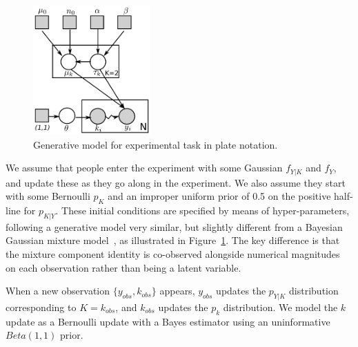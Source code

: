 \documentclass[10pt,letterpaper]{article}
\begin{document}




\begin{figure}
    \centering
    \includegraphics[width=0.4\textwidth]{results/model.pdf}
    \caption{Generative model for experimental task in plate notation.}
    \label{fig:model}
\end{figure}

We assume that people enter the experiment with some Gaussian $f_{Y|K}$ and $f_Y$, and update these as they go along in the experiment. We also assume they start with some Bernoulli $p_K$ and an improper uniform prior of 0.5 on the positive half-line for $p_{K|Y}$. These initial conditions are specified by means of hyper-parameters, following a generative model very similar, but slightly different from a Bayesian Gaussian mixture model~\cite{bishop2006pattern}, as illustrated in Figure~\ref{fig:model}. The key difference is that the mixture component identity is co-observed alongside numerical magnitudes on each observation rather than being a latent variable. 

When a new observation $\{y_{obs}, k_{obs}\}$ appears, $y_{obs}$ updates the $p_{Y|K}$ distribution corresponding to $K = k_{obs}$, and $k_{obs}$ updates the $p_k$ distribution. We model the $k$ update as a Bernoulli update with a Bayes estimator using an uninformative $Beta(1,1)$ prior. 
\end{document}
